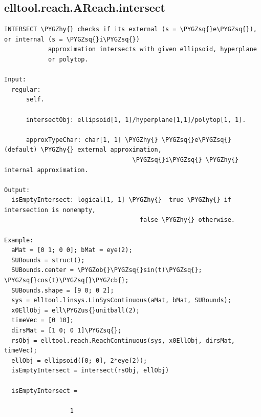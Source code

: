 \documentclass[letterpaper,10pt,english]{sphinxmanual}
\def\PYGZus{\char`\_}
\def\PYGZob{\char`\{}
\def\PYGZcb{\char`\}}
\def\PYGZhy{\char`\-}
\def\PYGZsq{\char`\'}
\begin{document}
\subsection{elltool.reach.AReach.intersect}
\label{chap_functions:elltool-reach-areach-intersect}
\begin{Verbatim}[commandchars=\\\{\}]
INTERSECT \PYGZhy{} checks if its external (s = \PYGZsq{}e\PYGZsq{}), or internal (s = \PYGZsq{}i\PYGZsq{})
            approximation intersects with given ellipsoid, hyperplane
            or polytop.

Input:
  regular:
      self.

      intersectObj: ellipsoid[1, 1]/hyperplane[1,1]/polytop[1, 1].

      approxTypeChar: char[1, 1] \PYGZhy{} \PYGZsq{}e\PYGZsq{} (default) \PYGZhy{} external approximation,
                                   \PYGZsq{}i\PYGZsq{} \PYGZhy{} internal approximation.

Output:
  isEmptyIntersect: logical[1, 1] \PYGZhy{}  true \PYGZhy{} if intersection is nonempty,
                                     false \PYGZhy{} otherwise.

Example:
  aMat = [0 1; 0 0]; bMat = eye(2);
  SUBounds = struct();
  SUBounds.center = \PYGZob{}\PYGZsq{}sin(t)\PYGZsq{}; \PYGZsq{}cos(t)\PYGZsq{}\PYGZcb{};
  SUBounds.shape = [9 0; 0 2];
  sys = elltool.linsys.LinSysContinuous(aMat, bMat, SUBounds);
  x0EllObj = ell\PYGZus{}unitball(2);
  timeVec = [0 10];
  dirsMat = [1 0; 0 1]\PYGZsq{};
  rsObj = elltool.reach.ReachContinuous(sys, x0EllObj, dirsMat, timeVec);
  ellObj = ellipsoid([0; 0], 2*eye(2));
  isEmptyIntersect = intersect(rsObj, ellObj)

  isEmptyIntersect =

                  1
\end{Verbatim}
\end{document}
